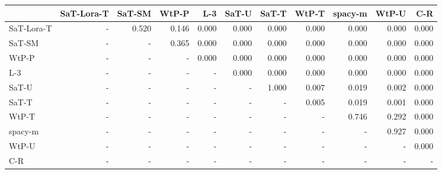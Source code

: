 \begin{tabular}{lrrrrrrrrrr}
\toprule
 & SaT-Lora-T & SaT-SM & WtP-P & L-3 & SaT-U & SaT-T & WtP-T & spacy-m & WtP-U & C-R \\
\midrule
SaT-Lora-T & - & 0.520 & 0.146 & 0.000 & 0.000 & 0.000 & 0.000 & 0.000 & 0.000 & 0.000 \\
SaT-SM & - & - & 0.365 & 0.000 & 0.000 & 0.000 & 0.000 & 0.000 & 0.000 & 0.000 \\
WtP-P & - & - & - & 0.000 & 0.000 & 0.000 & 0.000 & 0.000 & 0.000 & 0.000 \\
L-3 & - & - & - & - & 0.000 & 0.000 & 0.000 & 0.000 & 0.000 & 0.000 \\
SaT-U & - & - & - & - & - & 1.000 & 0.007 & 0.019 & 0.002 & 0.000 \\
SaT-T & - & - & - & - & - & - & 0.005 & 0.019 & 0.001 & 0.000 \\
WtP-T & - & - & - & - & - & - & - & 0.746 & 0.292 & 0.000 \\
spacy-m & - & - & - & - & - & - & - & - & 0.927 & 0.000 \\
WtP-U & - & - & - & - & - & - & - & - & - & 0.000 \\
C-R & - & - & - & - & - & - & - & - & - & - \\
\bottomrule
\end{tabular}

